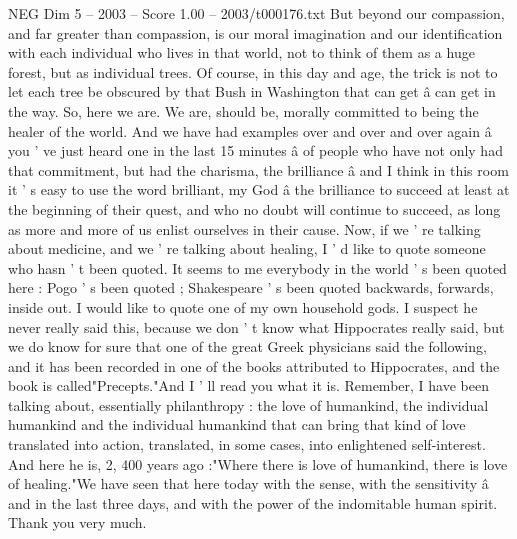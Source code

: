\begin{textsample}{NEG Dim 5 – 2003 – Score 1.00 – 2003/t000176.txt}
But beyond our compassion, and far greater than compassion, is our moral imagination and our identification with each individual who lives in that world, not to think of them as a huge forest, but as individual trees.
Of course, in this day and age, the trick is not to let each tree be obscured by that Bush in Washington that can get â can get in the way.
So, here we are.
We are, should be, morally committed to being the healer of the world.
And we have had examples over and over and over again â you ' ve just heard one in the last 15 minutes â of people who have not only had that commitment, but had the charisma, the brilliance â and I think in this room it ' s easy to use the word brilliant, my God â the brilliance to succeed at least at the beginning of their quest, and who no doubt will continue to succeed, as long as more and more of us enlist ourselves in their cause.
Now, if we ' re talking about medicine, and we ' re talking about healing, I ' d like to quote someone who hasn ' t been quoted.
It seems to me everybody in the world ' s been quoted here : Pogo ' s been quoted ; Shakespeare ' s been quoted backwards, forwards, inside out.
I would like to quote one of my own household gods.
I suspect he never really said this, because we don ' t know what Hippocrates really said, but we do know for sure that one of the great Greek physicians said the following, and it has been recorded in one of the books attributed to Hippocrates, and the book is called"Precepts."And I ' ll read you what it is.
Remember, I have been talking about, essentially philanthropy : the love of humankind, the individual humankind and the individual humankind that can bring that kind of love translated into action, translated, in some cases, into enlightened self-interest.
And here he is, 2, 400 years ago :"Where there is love of humankind, there is love of healing."We have seen that here today with the sense, with the sensitivity â and in the last three days, and with the power of the indomitable human spirit.
Thank you very much.

\end{textsample}
